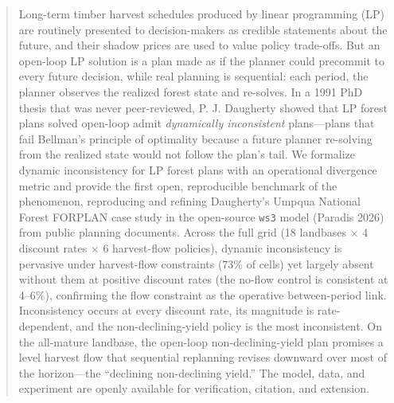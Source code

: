 \begin{abstract}
Long-term timber harvest schedules produced by linear programming (LP) are routinely presented to decision-makers as credible statements about the future, and their shadow prices are used to value policy trade-offs. But an open-loop LP solution is a plan made as if the planner could precommit to every future decision, while real planning is sequential: each period, the planner observes the realized forest state and re-solves. In a 1991 PhD thesis that was never peer-reviewed, P. J. Daugherty showed that LP forest plans solved open-loop admit \emph{dynamically inconsistent} plans---plans that fail Bellman's principle of optimality because a future planner re-solving from the realized state would not follow the plan's tail. We formalize dynamic inconsistency for LP forest plans with an operational divergence metric and provide the first open, reproducible benchmark of the phenomenon, reproducing and refining Daugherty's Umpqua National Forest FORPLAN case study in the open-source \texttt{ws3} model (Paradis 2026) from public planning documents. Across the full grid (18 landbases $\times$ 4 discount rates $\times$ 6 harvest-flow policies), dynamic inconsistency is pervasive under harvest-flow constraints (73\% of cells) yet largely absent without them at positive discount rates (the no-flow control is consistent at 4--6\%), confirming the flow constraint as the operative between-period link. Inconsistency occurs at every discount rate, its magnitude is rate-dependent, and the non-declining-yield policy is the most inconsistent. On the all-mature landbase, the open-loop non-declining-yield plan promises a level harvest flow that sequential replanning revises downward over most of the horizon---the ``declining non-declining yield.'' The model, data, and experiment are openly available for verification, citation, and extension.
\end{abstract}
